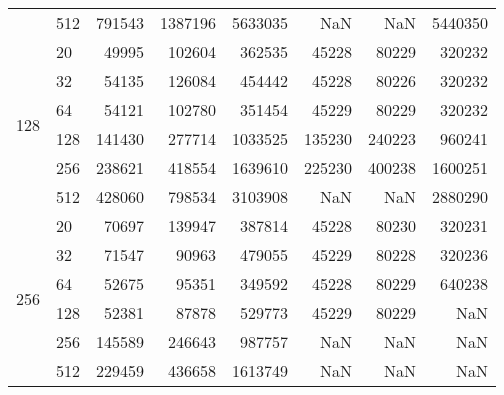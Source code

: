 \begin{table}
\begin{tabular}{llrrrrrr}
    & 512 &   791543 & 1387196 &  5633035 &    NaN &     NaN & 5440350 \\
\cline{1-8}
\multirow{6}{*}{128} & 20  &    49995 &  102604 &   362535 &  45228 &   80229 &  320232 \\
    & 32  &    54135 &  126084 &   454442 &  45228 &   80226 &  320232 \\
    & 64  &    54121 &  102780 &   351454 &  45229 &   80229 &  320232 \\
    & 128 &   141430 &  277714 &  1033525 & 135230 &  240223 &  960241 \\
    & 256 &   238621 &  418554 &  1639610 & 225230 &  400238 & 1600251 \\
    & 512 &   428060 &  798534 &  3103908 &    NaN &     NaN & 2880290 \\
\cline{1-8}
\multirow{6}{*}{256} & 20  &    70697 &  139947 &   387814 &  45228 &   80230 &  320231 \\
    & 32  &    71547 &   90963 &   479055 &  45229 &   80228 &  320236 \\
    & 64  &    52675 &   95351 &   349592 &  45228 &   80229 &  640238 \\
    & 128 &    52381 &   87878 &   529773 &  45229 &   80229 &     NaN \\
    & 256 &   145589 &  246643 &   987757 &    NaN &     NaN &     NaN \\
    & 512 &   229459 &  436658 &  1613749 &    NaN &     NaN &     NaN \\
\bottomrule
\end{tabular}
\end{table}
